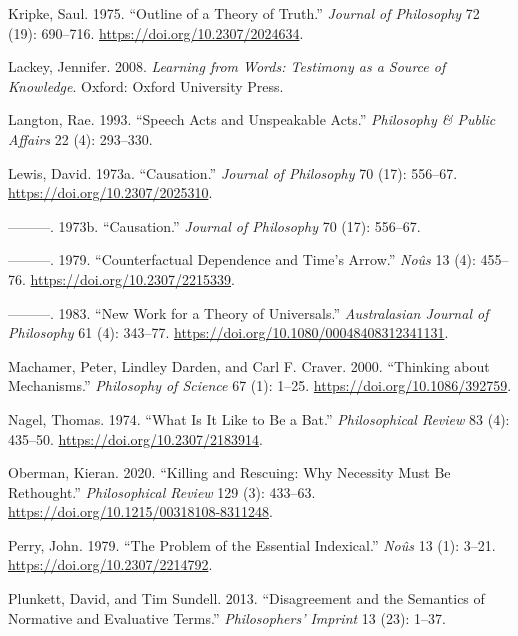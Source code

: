 \documentclass[
  12pt,
  letterpaper,
  DIV=11,
  numbers=noendperiod]{scrartcl}
\newlength{\cslhangindent}
\newenvironment{CSLReferences}[2] %
 {\begin{list}{}{%
  \setlength{\itemindent}{0pt}
  \setlength{\leftmargin}{0pt}
  \setlength{\parsep}{0pt}
  \ifodd #1
   \setlength{\leftmargin}{\cslhangindent}
   \setlength{\itemindent}{-1\cslhangindent}
  \fi
  \setlength{\itemsep}{#2\baselineskip}}}
 {\end{list}}
\begin{document}
\begin{CSLReferences}{1}{0}
Kripke, Saul. 1975. {``Outline of a Theory of Truth.''} \emph{Journal of
Philosophy} 72 (19): 690--716. \url{https://doi.org/10.2307/2024634}.

Lackey, Jennifer. 2008. \emph{Learning from Words: Testimony as a Source
of Knowledge}. Oxford: Oxford University Press.

Langton, Rae. 1993. {``Speech Acts and Unspeakable Acts.''}
\emph{Philosophy \& Public Affairs} 22 (4): 293--330.

Lewis, David. 1973a. {``Causation.''} \emph{Journal of Philosophy} 70
(17): 556--67. \url{https://doi.org/10.2307/2025310}.

---------. 1973b. {``Causation.''} \emph{Journal of Philosophy} 70 (17):
556--67.

---------. 1979. {``Counterfactual Dependence and Time's Arrow.''}
\emph{Noûs} 13 (4): 455--76. \url{https://doi.org/10.2307/2215339}.

---------. 1983. {``New Work for a Theory of Universals.''}
\emph{Australasian Journal of Philosophy} 61 (4): 343--77.
\url{https://doi.org/10.1080/00048408312341131}.

Machamer, Peter, Lindley Darden, and Carl F. Craver. 2000. {``Thinking
about Mechanisms.''} \emph{Philosophy of Science} 67 (1): 1--25.
\url{https://doi.org/10.1086/392759}.

Nagel, Thomas. 1974. {``What Is It Like to Be a Bat.''}
\emph{Philosophical Review} 83 (4): 435--50.
\url{https://doi.org/10.2307/2183914}.

Oberman, Kieran. 2020. {``Killing and Rescuing: Why Necessity Must Be
Rethought.''} \emph{Philosophical Review} 129 (3): 433--63.
\url{https://doi.org/10.1215/00318108-8311248}.

Perry, John. 1979. {``The Problem of the Essential Indexical.''}
\emph{Noûs} 13 (1): 3--21. \url{https://doi.org/10.2307/2214792}.

Plunkett, David, and Tim Sundell. 2013. {``Disagreement and the
Semantics of Normative and Evaluative Terms.''} \emph{Philosophers'
Imprint} 13 (23): 1--37.


\end{CSLReferences}
\end{document}
